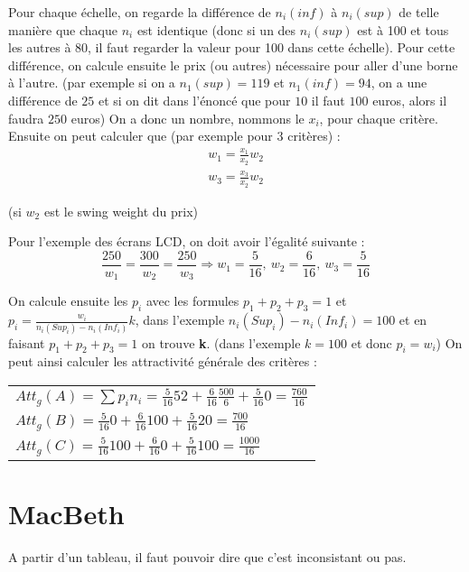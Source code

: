 \documentclass{article}
\begin{document}
Pour chaque échelle, on regarde la différence de $n_i(inf)$ à $n_i(sup)$ de telle manière que chaque $n_i$ est identique (donc si un des $n_i(sup)$ est à 100 et tous les autres à 
80, il faut regarder la valeur pour 100 dans cette échelle). Pour cette différence, on calcule ensuite le prix (ou autres) nécessaire pour aller d'une borne à l'autre. (par exemple si 
on a $n_1(sup) = 119$ et $n_1(inf) = 94$, on a une différence de $25$ et si on dit dans l'énoncé que pour $10$ il faut $100$ euros, alors il faudra $250$ euros) On a donc un nombre, 
nommons le $x_i$, pour chaque critère. Ensuite on peut calculer que (par exemple pour 3 critères) : 
\[
\boxed{\begin{array}{l}
w_1 = \frac{x_1}{x_2} w_2 \\
w_3 = \frac{x_3}{x_2} w_2
\end{array}} 
\] 

(si $w_2$ est le swing weight du prix)

\noindent Pour l'exemple des écrans LCD, on doit avoir l'égalité suivante : 
\[ \frac{250}{w_1} = \frac{300}{w_2} = \frac{250}{w_3} \Rightarrow \boxed{w_1 = \frac{5}{16}},\ \boxed{w_2 = \frac{6}{16}},\ \boxed{w_3 = \frac{5}{16}}\]

\noindent On calcule ensuite les $p_i$ avec les formules $p_1+p_2+p_3=1$ et $p_i = \frac{w_i}{n_i(Sup_i)-n_i(Inf_i)} k$, dans l'exemple $n_i(Sup_i)-n_i(Inf_i) = 100$ et en 
faisant $p_1+p_2+p_3=1$ on trouve \textbf{k}. (dans l'exemple $k = 100$ et donc $p_i = w_i$) On peut ainsi calculer les attractivité générale des critères :
\begin{center}
	\begin{tabular}{l}
	$Att_g(A) = \sum p_i n_i = \frac{5}{16} 52 + \frac{6}{16} \frac{500}{6} + \frac{5}{16} 0 = \boxed{\frac{760}{16}}$ \\
	$Att_g(B) = \frac{5}{16}0 + \frac{6}{16} 100 + \frac{5}{16} 20 = \boxed{\frac{700}{16}}$ \\
	$Att_g(C) = \frac{5}{16}100 + \frac{6}{16} 0 + \frac{5}{16} 100 = \boxed{\frac{1000}{16}}$ \\
	\end{tabular}
\end{center}

\newpage

\section{MacBeth}

A partir d'un tableau, il faut pouvoir dire que c'est inconsistant ou pas.
\end{document}
